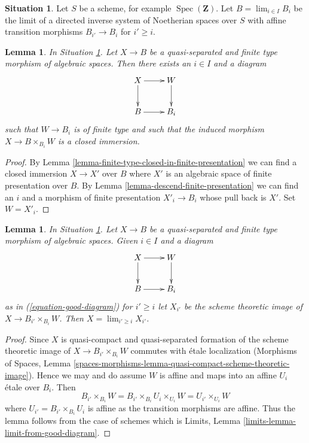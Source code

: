\documentclass{stacks-project}
\theoremstyle{plain}
\newtheorem{lemma}[subsection]{Lemma}
\theoremstyle{definition}
\newtheorem{situation}[subsection]{Situation}
\theoremstyle{remark}
\numberwithin{equation}{subsection}
\def\lim{\mathop{\mathrm{lim}}\nolimits}
\def\Spec{\mathop{\mathrm{Spec}}}
\begin{document}
\begin{situation}
\label{situation-limit-noetherian}
Let $S$ be a scheme, for example $\Spec(\mathbf{Z})$.
Let $B = \lim_{i \in I} B_i$ be the limit
of a directed inverse system of Noetherian spaces over $S$
with affine transition morphisms
$B_{i'} \to B_i$ for $i' \geq i$.
\end{situation}

\begin{lemma}
\label{lemma-good-diagram}
In Situation \ref{situation-limit-noetherian}.
Let $X \to B$ be a quasi-separated and finite type
morphism of algebraic spaces.
Then there exists an $i \in I$ and a diagram
\begin{equation}
\label{equation-good-diagram}
\vcenter{
\xymatrix{
X \ar[r] \ar[d] & W \ar[d] \\
B \ar[r] & B_i
}
}
\end{equation}
such that $W \to B_i$ is of finite type and such that
the induced morphism $X \to B \times_{B_i} W$ is a closed
immersion.
\end{lemma}

\begin{proof}
By Lemma \ref{lemma-finite-type-closed-in-finite-presentation}
we can find a closed immersion $X \to X'$
over $B$ where $X'$ is an algebraic space of finite presentation over $B$.
By Lemma \ref{lemma-descend-finite-presentation}
we can find an $i$ and a morphism of finite presentation
$X'_i \to B_i$ whose pull back is $X'$. Set $W = X'_i$.
\end{proof}

\begin{lemma}
\label{lemma-limit-from-good-diagram}
In Situation \ref{situation-limit-noetherian}.
Let $X \to B$ be a quasi-separated and finite type morphism
of algebraic spaces. Given $i \in I$ and a diagram
$$
\vcenter{
\xymatrix{
X \ar[r] \ar[d] & W \ar[d] \\
B \ar[r] & B_i
}
}
$$
as in (\ref{equation-good-diagram}) for $i' \geq i$ let
$X_{i'}$ be the scheme theoretic image of $X \to B_{i'} \times_{B_i} W$.
Then $X = \lim_{i' \geq i} X_{i'}$.
\end{lemma}

\begin{proof}
Since $X$ is quasi-compact and quasi-separated formation of the
scheme theoretic image of $X \to B_{i'} \times_{B_i} W$
commutes with \'etale localization
(Morphisms of Spaces, Lemma
\ref{spaces-morphisms-lemma-quasi-compact-scheme-theoretic-image}).
Hence we may and do assume $W$ is affine and maps into an affine
$U_i$ \'etale over $B_i$. Then
$$
B_{i'} \times_{B_i} W =
B_{i'} \times_{B_i} U_i \times_{U_i} W =
U_{i'} \times_{U_i} W
$$
where $U_{i'} = B_{i'} \times_{B_i} U_i$ is affine as the transition
morphisms are affine. Thus the lemma follows from the case of schemes
which is
Limits, Lemma \ref{limits-lemma-limit-from-good-diagram}.
\end{proof}
\end{document}
